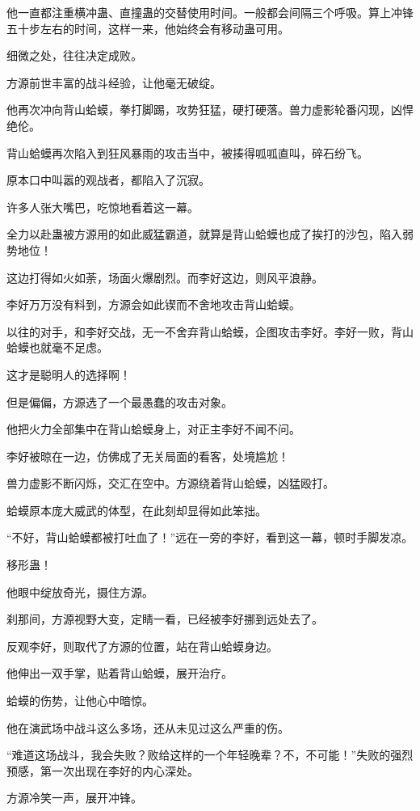 \begin{this_body}
他一直都注重横冲蛊、直撞蛊的交替使用时间。一般都会间隔三个呼吸。算上冲锋五十步左右的时间，这样一来，他始终会有移动蛊可用。

细微之处，往往决定成败。

方源前世丰富的战斗经验，让他毫无破绽。

他再次冲向背山蛤蟆，拳打脚踢，攻势狂猛，硬打硬落。兽力虚影轮番闪现，凶悍绝伦。

背山蛤蟆再次陷入到狂风暴雨的攻击当中，被揍得呱呱直叫，碎石纷飞。

原本口中叫嚣的观战者，都陷入了沉寂。

许多人张大嘴巴，吃惊地看着这一幕。

全力以赴蛊被方源用的如此威猛霸道，就算是背山蛤蟆也成了挨打的沙包，陷入弱势地位！

这边打得如火如荼，场面火爆剧烈。而李好这边，则风平浪静。

李好万万没有料到，方源会如此锲而不舍地攻击背山蛤蟆。

以往的对手，和李好交战，无一不舍弃背山蛤蟆，企图攻击李好。李好一败，背山蛤蟆也就毫不足虑。

这才是聪明人的选择啊！

但是偏偏，方源选了一个最愚蠢的攻击对象。

他把火力全部集中在背山蛤蟆身上，对正主李好不闻不问。

李好被晾在一边，仿佛成了无关局面的看客，处境尴尬！

兽力虚影不断闪烁，交汇在空中。方源绕着背山蛤蟆，凶猛殴打。

蛤蟆原本庞大威武的体型，在此刻却显得如此笨拙。

“不好，背山蛤蟆都被打吐血了！”远在一旁的李好，看到这一幕，顿时手脚发凉。

移形蛊！

他眼中绽放奇光，摄住方源。

刹那间，方源视野大变，定睛一看，已经被李好挪到远处去了。

反观李好，则取代了方源的位置，站在背山蛤蟆身边。

他伸出一双手掌，贴着背山蛤蟆，展开治疗。

蛤蟆的伤势，让他心中暗惊。

他在演武场中战斗这么多场，还从未见过这么严重的伤。

“难道这场战斗，我会失败？败给这样的一个年轻晚辈？不，不可能！”失败的强烈预感，第一次出现在李好的内心深处。

方源冷笑一声，展开冲锋。


\end{this_body}
